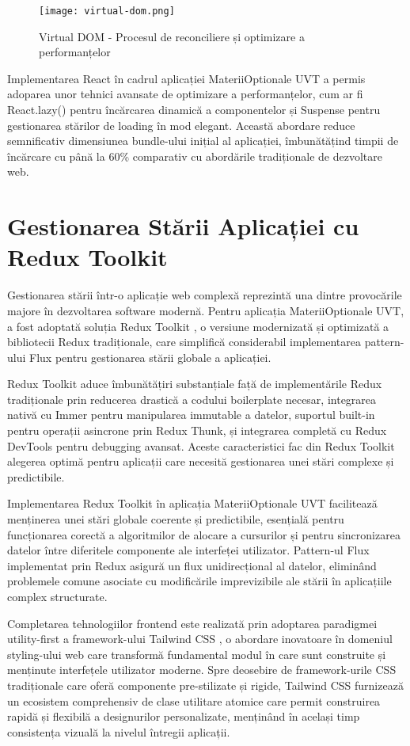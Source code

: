 \documentclass[12pt,a4paper]{report}
\begin{document}
\begin{figure}[H]
\centering
\texttt{[image: virtual-dom.png]}
\caption{Virtual DOM - Procesul de reconciliere și optimizare a performanțelor}
\label{fig:virtual-dom}
\end{figure}

Implementarea React în cadrul aplicației MateriiOptionale UVT a permis adoparea unor tehnici avansate de optimizare a performanțelor, cum ar fi React.lazy() pentru încărcarea dinamică a componentelor și Suspense pentru gestionarea stărilor de loading în mod elegant. Această abordare reduce semnificativ dimensiunea bundle-ului inițial al aplicației, îmbunătățind timpii de încărcare cu până la 60\% comparativ cu abordările tradiționale de dezvoltare web.

\section{Gestionarea Stării Aplicației cu Redux Toolkit}

Gestionarea stării într-o aplicație web complexă reprezintă una dintre provocările majore în dezvoltarea software modernă. Pentru aplicația MateriiOptionale UVT, a fost adoptată soluția Redux Toolkit \cite{redux-toolkit}, o versiune modernizată și optimizată a bibliotecii Redux tradiționale, care simplifică considerabil implementarea pattern-ului Flux pentru gestionarea stării globale a aplicației.

Redux Toolkit aduce îmbunătățiri substanțiale față de implementările Redux tradiționale prin reducerea drastică a codului boilerplate necesar, integrarea nativă cu Immer pentru manipularea immutable a datelor, suportul built-in pentru operații asincrone prin Redux Thunk, și integrarea completă cu Redux DevTools pentru debugging avansat. Aceste caracteristici fac din Redux Toolkit alegerea optimă pentru aplicații care necesită gestionarea unei stări complexe și predictibile.

Implementarea Redux Toolkit în aplicația MateriiOptionale UVT facilitează menținerea unei stări globale coerente și predictibile, esențială pentru funcționarea corectă a algoritmilor de alocare a cursurilor și pentru sincronizarea datelor între diferitele componente ale interfeței utilizator. Pattern-ul Flux implementat prin Redux asigură un flux unidirecțional al datelor, eliminând problemele comune asociate cu modificările imprevizibile ale stării în aplicațiile complex structurate.

Completarea tehnologiilor frontend este realizată prin adoptarea paradigmei utility-first a framework-ului Tailwind CSS \cite{tailwind-css}, o abordare inovatoare în domeniul styling-ului web care transformă fundamental modul în care sunt construite și menținute interfețele utilizator moderne. Spre deosebire de framework-urile CSS tradiționale care oferă componente pre-stilizate și rigide, Tailwind CSS furnizează un ecosistem comprehensiv de clase utilitare atomice care permit construirea rapidă și flexibilă a designurilor personalizate, menținând în același timp consistența vizuală la nivelul întregii aplicații.
\end{document}
